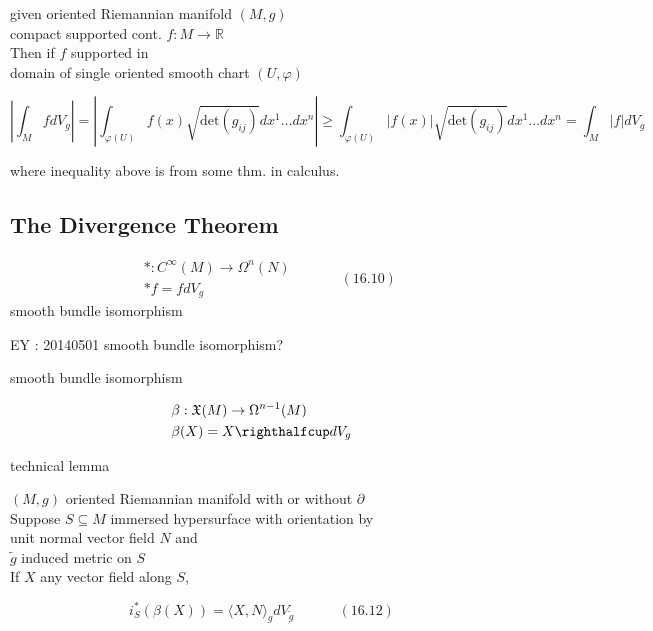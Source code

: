  given oriented Riemannian manifold $(M,g)$ \\
\quad compact supported cont. $f: M \to \mathbb{R}$ \\

Then if $f$ supported in \\
\phantom{Then } domain of single oriented smooth chart $(U,\varphi)$ 

\[
\left| \int_M f dV_g \right| = \left| \int_{ \varphi{ (U)} } f(x) \sqrt{ \text{det}{ (g_{ij} )} } dx^1 \dots dx^n \right| \geq \int_{\varphi{ (U)} } |f(x) | \sqrt{ \text{det}{ (g_{ij})} } dx^1 \dots dx^n = \int_M |f| dV_g
\]

where inequality above is from some thm. in calculus.  

\hrulefill

\subsection*{The Divergence Theorem}


\begin{equation}
  \begin{aligned}
    & * : C^{\infty}{ (M)} \to \Omega^n{ (N) } \\  
    & * f = f dV_g 
\end{aligned} \quad \quad \quad \, (16.10)
\end{equation}
smooth bundle isomorphism 

EY : 20140501 smooth bundle isomorphism? 

smooth bundle isomorphism

\[
\begin{aligned}
  & \beta : \mathfrak{X}{(M)} \to \Omega^{n-1}{ (M) } \\ 
  &  \beta(X) = X \righthalfcup dV_g
\end{aligned}
\]

technical lemma
\begin{lemma}[16.30]
  $(M,g)$ oriented Riemannian manifold with or without $\partial$ \\
  Suppose $S \subseteq M$ immersed hypersurface with orientation by \\
\phantom{Suppose } unit normal vector field $N$ and \\
\phantom{Suppose } $\widetilde{g}$ induced metric on $S$ \\

If $X$ any vector field along $S$, 

\begin{equation}
  i^*_S{ (\beta{ (X)} )}  = \langle X, N \rangle_g dV_{\widetilde{g}} \quad \quad \quad \, (16.12)
\end{equation}



\end{lemma}

